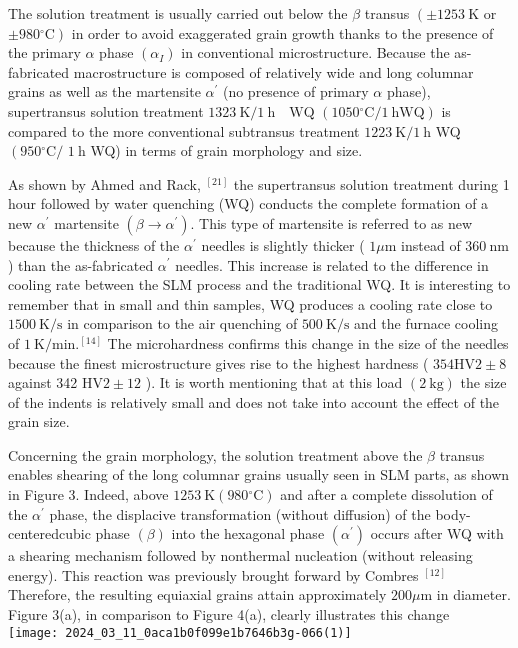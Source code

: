 \documentclass[10pt]{article}
\begin{document}
The solution treatment is usually carried out below the $\beta$ transus $\left( \pm 1253 \mathrm{~K}\right.$ or $\left.\pm 980{ }^{\circ} \mathrm{C}\right)$ in order to avoid exaggerated grain growth thanks to the presence of the primary $\alpha$ phase $\left(\alpha_{I}\right)$ in conventional microstructure. Because the as-fabricated macrostructure is composed of relatively wide and long columnar grains as well as the martensite $\alpha^{\prime}$ (no presence of primary $\alpha$ phase), supertransus solution treatment $1323 \mathrm{~K} / 1 \mathrm{~h} \quad \mathrm{WQ}$ $\left(1050{ }^{\circ} \mathrm{C} / 1 \mathrm{~h} \mathrm{WQ}\right)$ is compared to the more conventional subtransus treatment $1223 \mathrm{~K} / 1 \mathrm{~h}$ WQ $\left(950{ }^{\circ} \mathrm{C} /\right.$ $1 \mathrm{~h}$ WQ) in terms of grain morphology and size.

As shown by Ahmed and Rack, ${ }^{[21]}$ the supertransus solution treatment during 1 hour followed by water quenching (WQ) conducts the complete formation of a new $\alpha^{\prime}$ martensite $\left(\beta \rightarrow \alpha^{\prime}\right)$. This type of martensite is referred to as new because the thickness of the $\alpha^{\prime}$ needles is slightly thicker ( $1 \mu \mathrm{m}$ instead of $360 \mathrm{~nm}$ ) than the as-fabricated $\alpha^{\prime}$ needles. This increase is related to the difference in cooling rate between the SLM process and the traditional WQ. It is interesting to remember that in small and thin samples, WQ produces a cooling rate close to $1500 \mathrm{~K} / \mathrm{s}$ in comparison to the air quenching of $500 \mathrm{~K} / \mathrm{s}$ and the furnace cooling of $1 \mathrm{~K} / \mathrm{min} .^{[14]}$ The microhardness confirms this change in the size of the needles because the finest microstructure gives rise to the highest hardness ( $354 \mathrm{HV} 2 \pm 8$ against 342 $\mathrm{HV} 2 \pm 12$ ). It is worth mentioning that at this load $(2 \mathrm{~kg})$ the size of the indents is relatively small and does not take into account the effect of the grain size.

Concerning the grain morphology, the solution treatment above the $\beta$ transus enables shearing of the long columnar grains usually seen in SLM parts, as shown in Figure 3. Indeed, above $1253 \mathrm{~K}\left(980{ }^{\circ} \mathrm{C}\right)$ and after a complete dissolution of the $\alpha^{\prime}$ phase, the displacive transformation (without diffusion) of the body-centeredcubic phase $(\beta)$ into the hexagonal phase $\left(\alpha^{\prime}\right)$ occurs after WQ with a shearing mechanism followed by nonthermal nucleation (without releasing energy). This reaction was previously brought forward by Combres ${ }^{[12]}$ Therefore, the resulting equiaxial grains attain approximately $200 \mu \mathrm{m}$ in diameter. Figure 3(a), in comparison to Figure 4(a), clearly illustrates this change\\
\texttt{[image: 2024\_03\_11\_0aca1b0f099e1b7646b3g-066(1)]}
\end{document}
